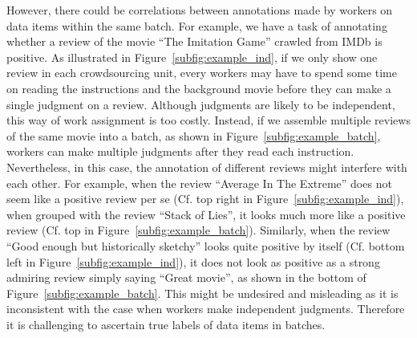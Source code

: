 However, there could be correlations between annotations made by workers on data items within the same batch.
For example, we have a task of annotating whether a review of the movie ``The Imitation Game'' crawled from IMDb is positive.
As illustrated in Figure~\ref{subfig:example_ind}, if we only show one review in each crowdsourcing unit,
every workers may have to spend some time on reading the instructions and the background movie before they can make a single judgment on a review.
Although judgments are likely to be independent, this way of work assignment is too costly.
Instead, if we assemble multiple reviews of the same movie into a batch, as shown in Figure~\ref{subfig:example_batch},
workers can make multiple judgments after they read each instruction.
Nevertheless, in this case, the annotation of different reviews might interfere with each other.
For example, when the review ``Average In The Extreme'' does not seem like a positive review per se (Cf. top right in Figure~\ref{subfig:example_ind}),
when grouped with the review ``Stack of Lies'', it looks much more like a positive review (Cf. top in Figure~\ref{subfig:example_batch}).
Similarly, when the review ``Good enough but historically sketchy'' looks quite positive by itself (Cf. bottom left in Figure~\ref{subfig:example_ind}),
it does not look as positive as a strong admiring review simply saying ``Great movie'', as shown in the bottom of Figure~\ref{subfig:example_batch}.
This might be undesired and misleading as it is inconsistent with the case when workers make independent judgments.
Therefore it is challenging to ascertain true labels of data items in batches.




